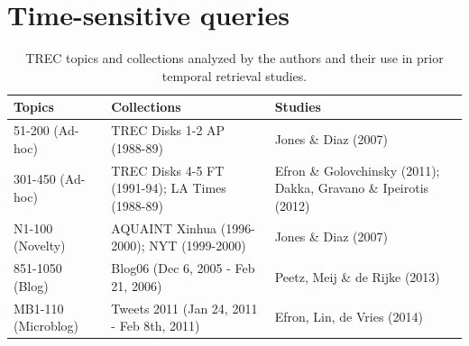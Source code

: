 \documentclass{sig-alternate-05-2015}
\begin{document}

\section{Time-sensitive queries}

\begin{table}[!ht]
\scriptsize
\begin{tabular}{| p{1.5cm} | p{3.1cm}  | p{2.5cm} |} \hline
\bf{Topics} & \bf{Collections} & \bf{Studies}\\ \hline
51-200 \newline(Ad-hoc) & TREC Disks 1-2 AP (1988-89) & Jones \& Diaz (2007) \\ \hline
301-450 \newline(Ad-hoc) & TREC Disks 4-5 FT (1991-94); LA Times (1988-89) & Efron \& Golovchinsky (2011);  Dakka, Gravano \& Ipeirotis (2012) \\ \hline
N1-100 \newline(Novelty) & AQUAINT Xinhua (1996-2000); NYT (1999-2000) & Jones \& Diaz (2007) \\ \hline
851-1050 \newline(Blog) & Blog06  (Dec 6, 2005 - Feb 21, 2006) & Peetz, Meij \& de Rijke (2013) \\ \hline
MB1-110 \newline(Microblog) & Tweets 2011 (Jan 24, 2011 - Feb 8th, 2011) & Efron, Lin, de Vries (2014)\\ \hline
\end{tabular}
\caption{TREC topics and collections analyzed by the authors and their use in prior temporal retrieval studies.}
\vspace{-.75em}
\label{table.topics}
\end{table}
\end{document}
